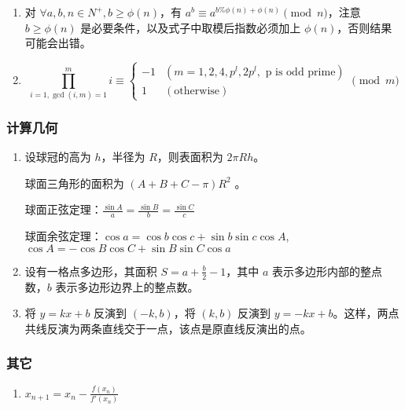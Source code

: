 \begin{enumerate}

\item 对 $\forall a, b, n \in N^{+}, b \ge \phi(n)$，有 $a ^ {b} \equiv a ^ {b \% \phi(n) + \phi(n)}\pmod{n}$，注意 $b \ge \phi(n)$ 是必要条件，以及式子中取模后指数必须加上 $\phi(n)$，否则结果可能会出错。

\item

$$
\prod_{i=1,\gcd(i,m)=1}^{m}i\equiv\begin{cases}
-1&(m=1,2,4,p^{l},2p^{l},\text{ p is odd prime})\\
1&(\text{otherwise})
\end{cases}\pmod{m}
$$

\end{enumerate}

\subsubsection{计算几何}

\begin{enumerate}

\item 设球冠的高为 $h$，半径为 $R$，则表面积为 $2\pi Rh$。

球面三角形的面积为 $(A+B+C-\pi)R^{2}$ 。

球面正弦定理：$\frac{\sin A}{a} = \frac{\sin B}{b} = \frac{\sin C}{c}$

球面余弦定理：$\cos a=\cos b\cos c+\sin b\sin c\cos A$, $\cos A=-\cos B\cos C+\sin B\sin C\cos a$

\item 设有一格点多边形，其面积 $S=a+\frac{b}{2}-1$，其中 $a$ 表示多边形内部的整点数，$b$ 表示多边形边界上的整点数。

\item 将 $y=kx+b$ 反演到 $(-k,b)$，将 $(k,b)$ 反演到 $y=-kx+b$。这样，两点共线反演为两条直线交于一点，该点是原直线反演出的点。

\end{enumerate}

\subsubsection{其它}

\begin{enumerate}

\item $x_{n+1}=x_{n}-\frac{f(x_{n})}{f'(x_{n})}$

\end{enumerate}

